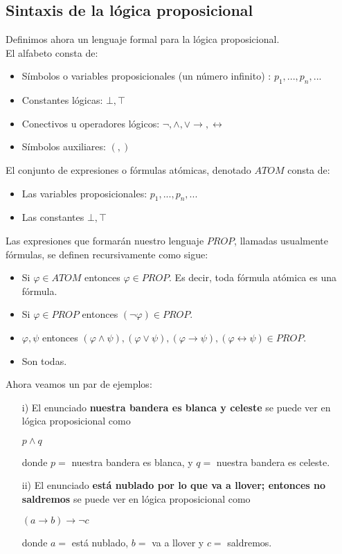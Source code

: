 \documentclass[letterpaper,11pt]{article}
\begin{document}
    \subsection{Sintaxis de la lógica proposicional}
    Definimos ahora un lenguaje formal para la lógica proposicional. \\
    El alfabeto consta de:
    \begin{itemize}
        \item Símbolos o variables proposicionales (un número 
        infinito) : $p_{1}, ... , p_{n}, ...$
        \item Constantes lógicas: $\bot, \top$
        \item Conectivos u operadores lógicos: $\neg, \land, \lor 
        \rightarrow, \leftrightarrow$
        \item Símbolos auxiliares: $(,)$
    \end{itemize}

    El conjunto de expresiones o fórmulas atómicas, denotado $ATOM$ consta de:
    \begin{itemize}
        \item Las variables proposicionales: $p_{1}, ..., p_{n}, ...$
        \item Las constantes $\bot, \top$
    \end{itemize}
    
    Las expresiones que formarán nuestro lenguaje $PROP$, llamadas usualmente
    fórmulas, se definen recursivamente como sigue: 
    \begin{itemize}
        \item Si $\varphi \in ATOM$ entonces $\varphi \in PROP$. Es decir,
        toda fórmula atómica es una fórmula.
        \item Si $\varphi \in PROP$ entonces $(\neg \varphi) \in PROP$.
        \item $\varphi, \psi$ entonces $(\varphi \land \psi), 
        (\varphi \lor \psi), (\varphi \rightarrow \psi), 
        (\varphi \leftrightarrow \psi) \in PROP$.
        \item Son todas.
    \end{itemize}

    \justify
    Ahora veamos un par de ejemplos:
    \begin{itemize}
        \item[i)] El enunciado \textbf{nuestra bandera es blanca y celeste} se
        puede ver en lógica proposicional como 
        \begin{center}
            $p \land q$
        \end{center}
        donde $p =$ nuestra bandera es blanca, y $q =$ nuestra bandera es
        celeste.
        \item[ii)] El enunciado \textbf{está nublado por lo que va a llover;
        entonces no saldremos} se puede ver en lógica proposicional como 
        \begin{center}
            $(a \rightarrow b) \rightarrow \neg c$
        \end{center}
        donde $a =$ está nublado, $b =$ va a llover y $c =$ saldremos.
    \end{itemize}
\end{document}

